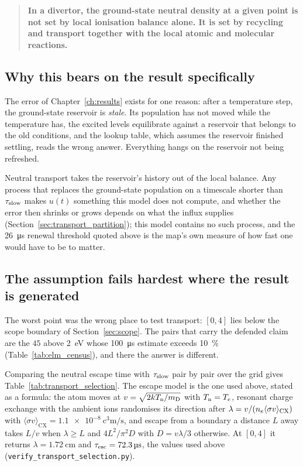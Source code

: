 \begin{quote}
\textbf{In a divertor, the ground-state neutral density at a given point is not
set by local ionisation balance alone. It is set by recycling and transport
together with the local atomic and molecular reactions.}
\end{quote}

\subsection{Why this bears on the result specifically}

The error of Chapter~\ref{ch:results} exists for one reason: after a temperature
step, the ground-state reservoir is \emph{stale}. Its population has not moved
while the temperature has, the excited levels equilibrate against a reservoir
that belongs to the old conditions, and the lookup table, which assumes the
reservoir finished settling, reads the wrong answer. Everything hangs on the
reservoir not being refreshed.

Neutral transport takes the reservoir's history out of the local balance. Any
process that replaces the ground-state population on a timescale shorter than
$\tau_{\mathrm{slow}}$ makes $u(t)$ something this model does not compute, and whether the
error then shrinks or grows depends on what the influx supplies
(Section~\ref{sec:transport_partition}); this model contains no such process,
and the \SI{26}{\micro\second} renewal threshold quoted above is the map's own
measure of how fast one would have to be to matter.

\subsection{The assumption fails hardest where the result is generated}
\label{sec:transport_selection}

The worst point was the wrong place to test transport: $[0,4]$ lies below the
scope boundary of Section~\ref{sec:scope}. The pairs that carry the defended
claim are the $45$ above \SI{2}{\electronvolt} whose \SI{100}{\micro\second}
estimate exceeds \SI{10}{\percent} (Table~\ref{tab:elm_census}), and there the
answer is different.

Comparing the neutral escape time with $\tau_{\mathrm{slow}}$ pair by pair over the grid
gives Table~\ref{tab:transport_selection}. The escape model is the one used
above, stated as a formula: the atom moves at $v=\sqrt{2kT_{\mathrm{n}}/m_{\mathrm D}}$
with $T_{\mathrm{n}}=T_e$, resonant charge exchange with the ambient ions randomises its
direction after $\lambda = v/(n_e\langle\sigma v\rangle_{\mathrm{CX}})$ with
$\langle\sigma v\rangle_{\mathrm{CX}} = \SI{1.1e-8}{\cubic\centi\metre\per\second}$,
and escape from a boundary a distance $L$ away takes $L/v$ when
$\lambda \ge L$ and $4L^{2}/\pi^{2}D$ with $D = v\lambda/3$ otherwise. At
$[0,4]$ it returns $\lambda = \SI{1.72}{\centi\metre}$ and
$\tau_{\mathrm{esc}} = \SI{72.3}{\micro\second}$, the values used above
(\texttt{verify\_transport\_selection.py}).

